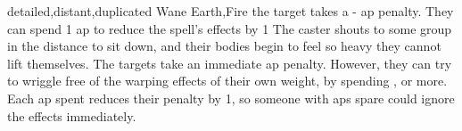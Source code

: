   {detailed,distant,duplicated}%
  {Wane}%
  {Earth,Fire}%
  {}%
  {the target takes a - \gls{ap} penalty. They can spend 1 \gls{ap} to reduce the spell's effects by 1}%
  {
    The caster shouts to some group in the distance to sit down, and their bodies begin to feel so heavy they cannot lift themselves.
    The targets take an immediate  \gls{ap} penalty.
    However, they can try to wriggle free of the warping effects of their own weight, by spending , or more.
    Each \gls{ap} spent reduces their penalty by 1, so someone with  \glspl{ap} spare could ignore the effects immediately.
  }

